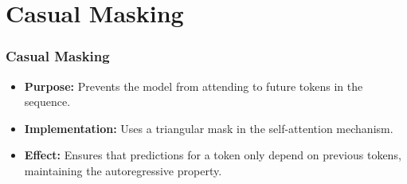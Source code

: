 \section{Casual Masking}
\begin{frame}
    \frametitle{Casual Masking}
    \begin{itemize}
        \item \textbf{Purpose:} Prevents the model from attending to future tokens in the sequence.
        \item \textbf{Implementation:} Uses a triangular mask in the self-attention mechanism.
        \item \textbf{Effect:} Ensures that predictions for a token only depend on previous tokens, maintaining the autoregressive property.
    \end{itemize}
\end{frame}
